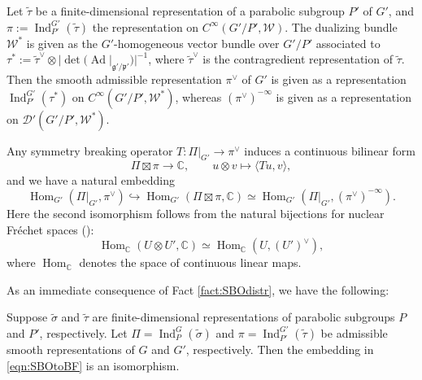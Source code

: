 \begin{example}
\label{ex:psdual}
Let $\widetilde \tau$ be a finite-dimensional representation
 of a parabolic subgroup $P'$ of $G'$, 
 and $\pi:={\operatorname{Ind}}_{P'}^{G'}(\widetilde \tau)$
 the representation on $C^{\infty}(G'/P', {\mathcal{W}})$.  
The dualizing bundle ${\mathcal{W}}^{\ast}$ is given
 as the $G'$-homogeneous vector bundle 
 over $G'/P'$
 associated to $\tau^{\ast}:= \widetilde \tau^{\vee} \otimes |\det ({\operatorname{Ad}}|_{{\mathfrak{g}}'/{\mathfrak{p}}'})|^{-1}$, 
 where $\widetilde \tau^{\vee}$ is the contragredient representation of $\widetilde \tau$.  
Then the smooth admissible representation $\pi^{\vee}$ of $G'$
 is given as a representation 
$
{\operatorname{Ind}}_{P'}^{G'}(\tau^{\ast})
$ 
 on $C^{\infty}(G'/P', {\mathcal{W}}^{\ast})$, 
 whereas $(\pi^{\vee})^{-\infty}$
 is given as a representation
 on ${\mathcal{D}}'(G'/P', {\mathcal{W}}^{\ast})$.  
\end{example}
Any symmetry breaking operator $T \colon \Pi|_{G'} \to \pi^{\vee}$
 induces a continuous bilinear form
\[
  \Pi \boxtimes \pi \to {\mathbb{C}}, 
\qquad
   u \otimes v \mapsto \langle T u, v \rangle,
\]
and we have a natural embedding
\begin{equation}
\label{eqn:SBOtoBF}
   {\operatorname{Hom}}_{G'}(\Pi|_{G'}, \pi^{\vee})
   \hookrightarrow
   {\operatorname{Hom}}_{G'}(\Pi \boxtimes \pi,{\mathbb{C}})
   \simeq
   {\operatorname{Hom}}_{G'}(\Pi|_{G'}, (\pi^{\vee})^{-\infty}).  
\end{equation}
Here the second isomorphism follows from the natural bijections 
 for nuclear Fr{\'e}chet spaces
 (\cite[Prop.~50.7]{Treves}):
\[
   {\operatorname{Hom}}_{{\mathbb{C}}}(U \otimes U',{\mathbb{C}})
   \simeq
   {\operatorname{Hom}}_{{\mathbb{C}}}(U, (U')^{\vee}), 
\]
  where ${\operatorname{Hom}}_{{\mathbb{C}}}$ denotes the space of continuous linear maps.  



As an immediate consequence of Fact \ref{fact:SBOdistr}, 
 we have the following:
\begin{proposition}
\label{prop:BSBOps}
Suppose $\widetilde \sigma$ and $\widetilde \tau$ are finite-dimensional representations
 of parabolic subgroups $P$ and $P'$,
 respectively.  
Let $\Pi={\operatorname{Ind}}_P^G (\widetilde \sigma)$
 and $\pi={\operatorname{Ind}}_{P'}^{G'} (\widetilde \tau)$
 be admissible smooth representations
 of $G$ and $G'$, 
 respectively.  
Then the embedding in \eqref{eqn:SBOtoBF} is an isomorphism.  
\end{proposition}

